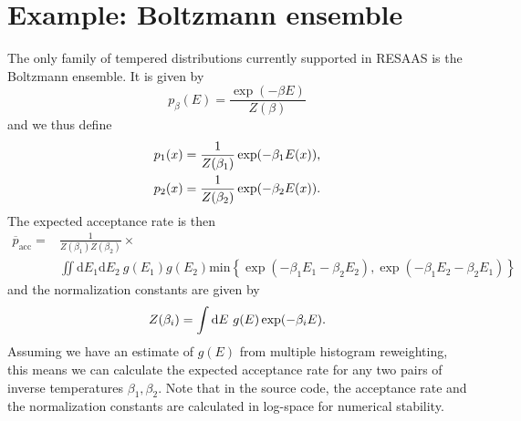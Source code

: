 \documentclass{article}
\renewcommand{\d}{\mathrm{d}}
\begin{document}
\section*{Example: Boltzmann ensemble}
The only family of tempered distributions currently supported in RESAAS is the Boltzmann ensemble. It is given by
\begin{equation*}
  p_\beta(E) = \frac{\exp(-\beta E)}{Z(\beta)}
\end{equation*}
and we thus define
\begin{gather}
\begin{aligned}
  p_1(x) &= \frac{1}{Z(\beta_1)}\exp(-\beta_1 E(x)) \mbox , \nonumber \\
  p_2(x) &= \frac{1}{Z(\beta_2)}\exp(-\beta_2 E(x)) \mbox . \nonumber 
\end{aligned}
\end{gather}
The expected acceptance rate is then
\begin{equation}
  \begin{split}
    \overline{p}_{\mathrm{acc}} = &\frac{1}{Z(\beta_1) Z(\beta_2)} \times \\
    &\iint \d E_1 \d E_2 \ g(E_1) g(E_2) \mathrm{min}\left\{\exp(-\beta_1E_1-\beta_2E_2), \exp(-\beta_1E_2-\beta_2E_1)\right\}
  \end{split}
\end{equation}
and the normalization constants are given by
\begin{equation*}
  Z(\beta_i) = \int \d E \ g(E) \exp(-\beta_i E) \mbox .
\end{equation*}
Assuming we have an estimate of $g(E)$ from multiple histogram reweighting, this means we can calculate the expected acceptance rate for any two pairs of inverse temperatures $\beta_1, \beta_2$. Note that in the source code, the acceptance rate and the normalization constants are calculated in log-space for numerical stability.
\end{document}
